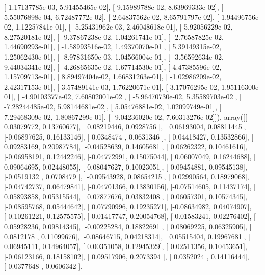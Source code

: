 \documentclass{article}
\begin{document}
       [  1.17137785e-03,   5.91455465e-02],
       [  9.15989788e-02,   8.63969333e-02],
       [  5.55076898e-04,   6.72487772e-02],
       [  2.64837562e-02,   8.65791797e-02],
       [  1.94496756e-02,   1.12257841e-01],
       [ -5.25431962e-03,   2.46048618e-01],
       [  5.92056229e-02,   8.27520181e-02],
       [ -9.37867238e-02,   1.04261741e-01],
       [ -2.76587825e-02,   1.44690293e-01],
       [ -1.58993516e-02,   1.49370070e-01],
       [  5.39149315e-02,   1.25062430e-01],
       [ -8.97831650e-03,   1.04566004e-01],
       [ -3.56592634e-02,   9.44034341e-02],
       [ -4.26865635e-02,   1.67714530e-01],
       [  4.47385596e-02,   1.15709713e-01],
       [  8.89497404e-02,   1.66831263e-01],
       [ -1.02986209e-02,   2.42317153e-01],
       [  3.57489141e-03,   1.76220671e-01],
       [  3.17076295e-02,   1.95116300e-01],
       [ -4.90103377e-02,   7.60802001e-02],
       [ -5.96470730e-02,   5.35589703e-02],
       [ -7.28244485e-02,   5.98144681e-02],
       [  5.05476881e-02,   1.02099749e-01],
       [  7.29468309e-02,   1.80867299e-01],
       [ -9.04236020e-02,   7.60313276e-02]]), array([[ 0.03079772,  0.13760677],
       [ 0.08219446,  0.0928756 ],
       [ 0.06193004,  0.08811445],
       [-0.06897625,  0.16133146],
       [ 0.0348474 ,  0.0631346 ],
       [ 0.04418427,  0.13532866],
       [ 0.09283169,  0.20987784],
       [-0.04528639,  0.14605681],
       [ 0.06262322,  0.10461616],
       [-0.06958191,  0.12442246],
       [-0.04772991,  0.15075044],
       [ 0.06007049,  0.16244688],
       [ 0.09064695,  0.02448055],
       [-0.08047627,  0.10023051],
       [ 0.09454881,  0.09545138],
       [-0.0519132 ,  0.0708479 ],
       [-0.09543928,  0.08654215],
       [ 0.02990564,  0.18979068],
       [-0.04742737,  0.06479841],
       [-0.04701366,  0.13830156],
       [-0.07514605,  0.11437174],
       [ 0.05893858,  0.05315544],
       [ 0.07877676,  0.03832408],
       [ 0.06057301,  0.10574345],
       [-0.08595768,  0.05444642],
       [ 0.07790996,  0.19235271],
       [-0.08634982,  0.04074907],
       [-0.10261221,  0.12575575],
       [-0.01417747,  0.20054768],
       [-0.01583241,  0.02276402],
       [ 0.05928236,  0.09814345],
       [-0.00225284,  0.18822691],
       [ 0.08069225,  0.06325905],
       [ 0.0812178 ,  0.11099676],
       [-0.08646715,  0.04218314],
       [ 0.05515404,  0.19967681],
       [ 0.06945111,  0.14964057],
       [ 0.00351058,  0.12945329],
       [ 0.02511356,  0.10453651],
       [-0.06123166,  0.18158102],
       [ 0.09517906,  0.2073394 ],
       [ 0.0352024 ,  0.14116444],
       [-0.0377648 ,  0.0606342 ],
\end{document}
